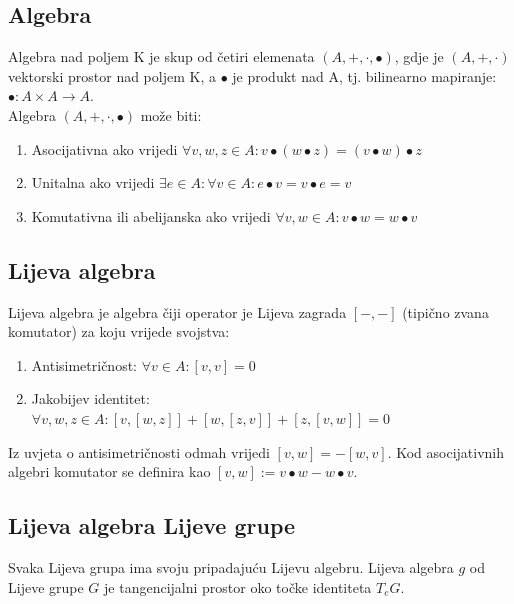\documentclass[times, utf8, diplomski, numeric]{fer}
\begin{document}
	\subsection{Algebra} Algebra nad poljem K je skup od četiri elemenata $(A, +, \cdot, \bullet)$, gdje je $(A, +, \cdot)$ vektorski prostor nad poljem K, a $\bullet$ je produkt nad A, tj. bilinearno mapiranje: $\bullet : A \times A \rightarrow A$. \\
	Algebra $(A, +, \cdot, \bullet)$ može biti:
	\begin{enumerate}
		\item Asocijativna ako vrijedi $\forall v, w, z \in A : v \bullet (w \bullet z) = (v \bullet w) \bullet z$
		
		\item Unitalna ako vrijedi $\exists e \in A : \forall v \in A : e \bullet v = v \bullet e = v$
		
		\item Komutativna ili abelijanska ako vrijedi $\forall v, w \in A : v \bullet w = w \bullet v$
	\end{enumerate}
	
	\subsection{Lijeva algebra} Lijeva algebra je algebra čiji operator je Lijeva zagrada $[-,-]$ (tipično zvana komutator) za koju vrijede svojstva: 
	
	\begin{enumerate}
		
		\item Antisimetričnost: $\forall v \in A: [v, v] = 0$
		
		\item Jakobijev identitet: $\forall v, w, z \in A : [v,[w, z]] + [w,[z,v]] + [z,[v,w]] = 0$
		
	\end{enumerate} 
	
	Iz uvjeta o antisimetričnosti odmah vrijedi $[v,w]=-[w,v]$. Kod asocijativnih algebri komutator se definira kao $[v,w]:=v \bullet w - w \bullet v$.
	
	\subsection{Lijeva algebra Lijeve grupe} Svaka Lijeva grupa ima svoju pripadajuću Lijevu algebru. Lijeva algebra $g$ od Lijeve grupe $G$ je tangencijalni prostor oko točke identiteta $T_e G$.
	
\end{document}
